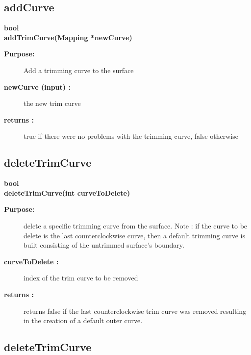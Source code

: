 \subsection{addCurve}
 
\begin{flushleft} \textbf{%
bool  \\ 
\settowidth{\TrimmedMappingIncludeArgIndent}{addTrimCurve(}%
addTrimCurve(Mapping *newCurve)
}\end{flushleft}
\begin{description}
\item[{\bf Purpose:}]  
    Add a trimming curve to the surface
\item[{\bf newCurve (input) :}]  the new trim curve
\item[{\bf returns :}]  true if there were no problems with the trimming curve, false otherwise
\end{description}
\subsection{deleteTrimCurve}
 
\begin{flushleft} \textbf{%
bool  \\ 
\settowidth{\TrimmedMappingIncludeArgIndent}{deleteTrimCurve(}%
deleteTrimCurve(int curveToDelete)
}\end{flushleft}
\begin{description}
\item[{\bf Purpose:}]  
    delete a specific trimming curve from the surface. Note : if the curve
 to be delete is the last counterclockwise curve, then a default trimming
 curve is built consisting of the untrimmed surface's boundary.
\item[{\bf curveToDelete :}]  index of the trim curve to be removed
\item[{\bf returns :}]  returns false if the last counterclockwise trim curve was removed 
 resulting in the creation of a default outer curve.
\end{description}
\subsection{deleteTrimCurve}
 
